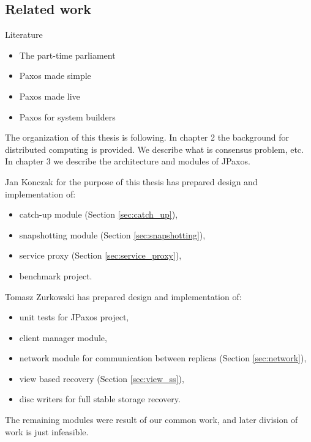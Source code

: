 \begin{TODO}

\section{Related work}
Literature

\begin{itemize}
  \item The part-time parliament
  \item Paxos made simple
  \item Paxos made live
  \item Paxos for system builders
\end{itemize}

\end{TODO}

\begin{TODO}
The organization of this thesis is following. In chapter 2 the background for distributed computing is provided. We describe what is consensus problem, etc. In chapter 3 we describe the architecture and modules of JPaxos.
\end{TODO}

Jan Konczak for the purpose of this thesis has prepared design and implementation of:
\begin{itemize}
  \item catch-up module (Section \ref{sec:catch_up}),
  \item snapshotting module (Section \ref{sec:snapshotting}),
  \item service proxy (Section \ref{sec:service_proxy}),
  \item benchmark project.
\end{itemize}

Tomasz Zurkowski has prepared design and implementation of:
\begin{itemize}
  \item unit tests for JPaxos project,
  \item client manager module, 
  \item network module for communication between replicas (Section \ref{sec:network}),
  \item view based recovery (Section \ref{sec:view_ss}),
  \item disc writers for full stable storage recovery.
\end{itemize}

The remaining modules were result of our common work, and later division of work is just infeasible.
